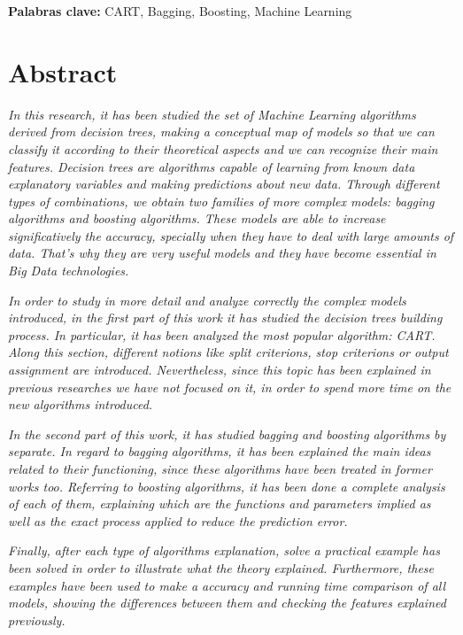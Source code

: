 \documentclass[12pt,twoside]{article}
\begin{document}
\textbf{Palabras clave:} CART, Bagging, Boosting, Machine Learning



\newpage



\section*{Abstract}

\emph{In this research, it has been studied the set of Machine Learning algorithms derived from decision trees, making a conceptual map of models so that we can classify it according to their theoretical aspects and we can recognize their main features. Decision trees are algorithms capable of learning from known data explanatory variables and making predictions about new data. Through different types of combinations, we obtain two families of more complex models: bagging algorithms and boosting algorithms. These models are able to increase significatively the accuracy, specially when they have to deal with large amounts of data. That's why they are very useful models and they have become essential in Big Data technologies.}

\emph{In order to study in more detail and analyze correctly the complex models introduced, in the first part of this work it has studied the decision trees building process. In particular, it has been analyzed the most popular algorithm: CART. Along this section, different notions like split criterions, stop criterions or output assignment are introduced. Nevertheless, since this topic has been explained in previous researches we have not focused on it, in order to spend more time on the new algorithms introduced.}

\emph{In the second part of this work, it has studied bagging and boosting algorithms by separate. In regard to bagging algorithms, it has been explained the main ideas related to their functioning, since these algorithms have been treated in former works too. Referring to boosting algorithms, it has been done a complete analysis of each of them, explaining which are the functions and parameters implied as well as the exact process applied to reduce the prediction error.}

\emph{Finally, after each type of algorithms explanation, solve a practical example has been solved in order to illustrate what the theory explained. Furthermore, these examples have been used to make a accuracy and running time comparison of all models, showing the differences between them and checking the features explained previously.}
\end{document}
